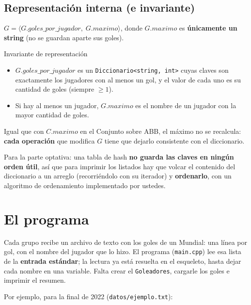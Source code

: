 \documentclass{article}
\begin{document}
\subsection{Representación interna (e invariante)}

$G = \langle G.goles\_por\_jugador,\; G.maximo \rangle$, donde
$G.maximo$ es \textbf{únicamente un string} (no se guardan aparte sus
goles).

\begin{invariante}{Invariante de representación}
\begin{itemize}
\item $G.goles\_por\_jugador$ es un \texttt{Diccionario<string, int>}
  cuyas claves son exactamente los jugadores con al menos un gol, y el
  valor de cada uno es su cantidad de goles (siempre $\geq 1$).
\item Si hay al menos un jugador, $G.maximo$ es el nombre de un jugador
  con la mayor cantidad de goles.
\end{itemize}
\end{invariante}

Igual que con $C.maximo$ en el Conjunto sobre ABB, el máximo no se
recalcula: \textbf{cada operación} que modifica $G$ tiene que dejarlo
consistente con el diccionario.

Para la parte optativa: una tabla de hash \textbf{no guarda las claves
en ningún orden útil}, así que para imprimir los listados hay que volcar
el contenido del diccionario a un arreglo (recorriéndolo con su
iterador) y \textbf{ordenarlo}, con un algoritmo de ordenamiento
implementado por ustedes.

\section{El programa}

Cada grupo recibe un archivo de texto con los goles de un Mundial: una
línea por gol, con el nombre del jugador que lo hizo. El programa
(\texttt{main.cpp}) lee esa lista de la \textbf{entrada estándar}; la
lectura ya está resuelta en el esqueleto, hasta dejar cada nombre en una
variable. Falta crear el \texttt{Goleadores}, cargarle los goles e
imprimir el resumen.

Por ejemplo, para la final de 2022 (\texttt{datos/ejemplo.txt}):
\end{document}
